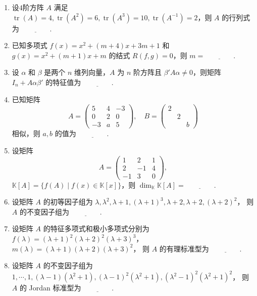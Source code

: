 \begin{enumerate}
    \item 设$4$阶方阵 $A$ 满足 $\operatorname{tr}(A)=4, \operatorname{tr}(A^{2})=6, \operatorname{tr}(A^{3})=10, \operatorname{tr}(A^{-1})=2$，则 $A$ 的行列式为 $\underline{\qquad\qquad}$.

    \item 已知多项式 $f(x)=x^{2}+(m+4)x+3m+1$ 和 $g(x)=x^{2}+(m+1)x+m$ 的结式 $R(f,g)=0$，则 $m = \underline{\qquad\qquad}$.

    \item 设 $\alpha$ 和 $\beta$ 是两个 $n$ 维列向量，$A$ 为 $n$ 阶方阵且 $\beta'A\alpha\ne 0$，则矩阵 $I_{n}+A\alpha\beta'$ 的特征值为 $\underline{\qquad\qquad}$.

    \item 已知矩阵
    $$A = \begin{pmatrix}
        5 & 4 & -3 \\
        0 & 2 & 0 \\
        -3 & a & 5
    \end{pmatrix}, \quad B = \begin{pmatrix}
        2 & & \\
        & 2 & \\
        & & b
    \end{pmatrix}$$
    相似，则 $a,b$ 的值为 $\underline{\qquad\qquad}$.

    \item 设矩阵
    $$A = \begin{pmatrix}
        1 & 2 & 1 \\
        2 & -1 & 4 \\
        -1 & 3 & 0
    \end{pmatrix},$$
    $\mathbb{K}[A]=\{f(A) \mid f(x)\in\mathbb{K}[x]\}$，则 $\dim_{\mathbb{K}}\mathbb{K}[A] = \underline{\qquad\qquad}$.

    \item 设矩阵 $A$ 的初等因子组为 $\lambda, \lambda^{2}, \lambda+1, (\lambda+1)^{3}, \lambda+2, \lambda+2, (\lambda+2)^{2}$，
    则 $A$ 的不变因子组为 $\underline{\qquad\qquad}$.

    \item 设矩阵 $A$ 的特征多项式和极小多项式分别为 $f(\lambda)=(\lambda+1)^{2}(\lambda+2)^{2}(\lambda+3)^{3}$， $m(\lambda)=(\lambda+1)(\lambda+2)(\lambda+3)^{2}$，
    则 $A$ 的有理标准型为 $\underline{\qquad\qquad}$.

    \item 设矩阵 $A$ 的不变因子组为 $1, \cdots, 1, (\lambda-1)(\lambda^{2}+1), (\lambda-1)^{2}(\lambda^{2}+1), (\lambda^{2}-1)^{2}(\lambda^{2}+1)^{2}$，
    则 $A$ 的 Jordan 标准型为 $\underline{\qquad\qquad}$.
\end{enumerate}

